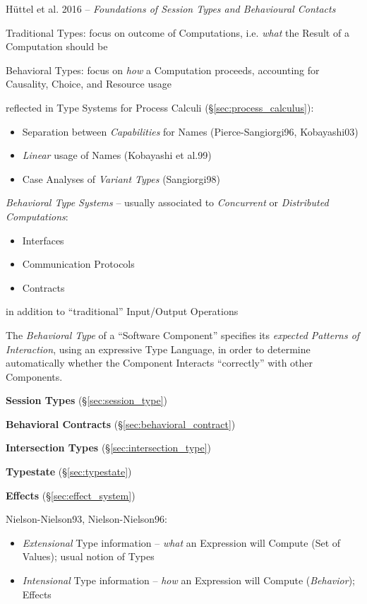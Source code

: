 \asterism


H\"uttel et al. 2016 --
\emph{Foundations of Session Types and Behavioural Contacts}

Traditional Types: focus on outcome of Computations, i.e. \emph{what}
the Result of a Computation should be

Behavioral Types: focus on \emph{how} a Computation proceeds,
accounting for Causality, Choice, and Resource usage

reflected in Type Systems for Process Calculi
(\S\ref{sec:process_calculus}):
\begin{itemize}
  \item Separation between \emph{Capabilities} for Names
    (Pierce-Sangiorgi96, Kobayashi03)
  \item \emph{Linear} usage of Names (Kobayashi et al.99)
  \item Case Analyses of \emph{Variant Types} (Sangiorgi98)
\end{itemize}

\emph{Behavioral Type Systems} -- usually associated to
\emph{Concurrent} or \emph{Distributed Computations}:
\begin{itemize}
  \item Interfaces
  \item Communication Protocols
  \item Contracts
\end{itemize}
in addition to ``traditional'' Input/Output Operations

The \emph{Behavioral Type} of a ``Software Component'' specifies its
\emph{expected Patterns of Interaction}, using an expressive Type
Language, in order to determine automatically whether the Component
Interacts ``correctly'' with other Components.

\textbf{Session Types} (\S\ref{sec:session_type})

\textbf{Behavioral Contracts} (\S\ref{sec:behavioral_contract})

\textbf{Intersection Types} (\S\ref{sec:intersection_type})

\textbf{Typestate} (\S\ref{sec:typestate})

\textbf{Effects} (\S\ref{sec:effect_system})

Nielson-Nielson93, Nielson-Nielson96:

\begin{itemize}
  \item \emph{Extensional} Type information -- \emph{what} an
    Expression will Compute (Set of Values); usual notion of Types
  \item \emph{Intensional} Type information -- \emph{how} an
    Expression will Compute (\emph{Behavior}); Effects
\end{itemize}


